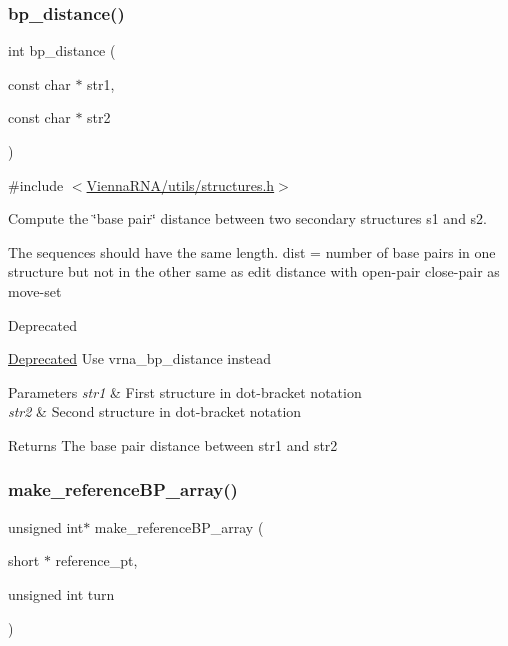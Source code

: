 \subsubsection{\texorpdfstring{bp\_distance()}{bp\_distance()}}
{\footnotesize\ttfamily int bp\+\_\+distance (\begin{DoxyParamCaption}\item[{const char $\ast$}]{str1,  }\item[{const char $\ast$}]{str2 }\end{DoxyParamCaption})}



{\ttfamily \#include $<$\mbox{\hyperlink{utils_2structures_8h}{Vienna\+R\+N\+A/utils/structures.\+h}}$>$}



Compute the \char`\"{}base pair\char`\"{} distance between two secondary structures s1 and s2. 

The sequences should have the same length. dist = number of base pairs in one structure but not in the other same as edit distance with open-\/pair close-\/pair as move-\/set

\begin{DoxyRefDesc}{Deprecated}
\item[\mbox{\hyperlink{deprecated__deprecated000204}{Deprecated}}]Use vrna\+\_\+bp\+\_\+distance instead\end{DoxyRefDesc}

\begin{DoxyParams}{Parameters}
{\em str1} & First structure in dot-\/bracket notation \\
\hline
{\em str2} & Second structure in dot-\/bracket notation \\
\hline
\end{DoxyParams}
\begin{DoxyReturn}{Returns}
The base pair distance between str1 and str2 
\end{DoxyReturn}
\mbox{\label{group__struct__utils__deprecated_ga578cd9712dee812fb1c58aa3cc489864}} 
\subsubsection{\texorpdfstring{make\_referenceBP\_array()}{make\_referenceBP\_array()}}
{\footnotesize\ttfamily unsigned int$\ast$ make\+\_\+reference\+B\+P\+\_\+array (\begin{DoxyParamCaption}\item[{short $\ast$}]{reference\+\_\+pt,  }\item[{unsigned int}]{turn }\end{DoxyParamCaption})}



